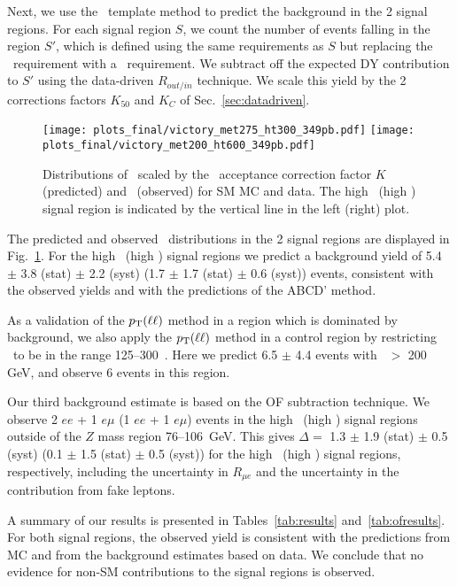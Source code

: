 Next, we use the \ptll\ template method to predict the background in the 2 signal regions.
For each signal region $S$, we count the number of events falling in the region $S'$, which is 
defined using the same requirements as $S$ but replacing the \MET\ requirement with a \ptll\
requirement. We subtract off the expected DY contribution to $S'$ using the data-driven $R_{out/in}$
technique. We scale this yield by the 2 corrections factors $K_{50}$ and $K_C$ of Sec.~\ref{sec:datadriven}.



\begin{figure}[hbt]
\begin{center}
\texttt{[image: plots\_final/victory\_met275\_ht300\_349pb.pdf]}
\texttt{[image: plots\_final/victory\_met200\_ht600\_349pb.pdf]}
\caption{\label{fig:victory}\protect 
Distributions of \ptll\ scaled by the \MET\ acceptance correction factor $K$ (predicted) 
and \met\ (observed) for SM MC and data. The high \MET\ (high \Ht) signal region
is indicated by the vertical line in the left (right) plot.
}
\end{center}
\end{figure}

The predicted and observed \MET\ distributions in the 2 signal regions are displayed
in Fig.~\ref{fig:victory}. For the high \MET\ (high \Ht) signal regions we predict
a background yield of 5.4 $\pm$ 3.8 (stat) $\pm$ 2.2 (syst) 
(1.7 $\pm$ 1.7 (stat) $\pm$ 0.6 (syst)) events, consistent with the observed yields
and with the predictions of the ABCD' method. 

As a validation of the $p_{\mathrm{T}}(\ell\ell)$ method in a region which is dominated by
background, we also apply the $p_{\mathrm{T}}(\ell\ell)$ method in a control region by restricting
\HT\ to be in the range 125--300~\GeV. Here we predict 6.5 $\pm$ 4.4 events with
\MET\ $>$ 200 GeV, and observe 6 events in this region.

Our third background estimate is based on the OF subtraction technique. We observe
2 $ee$ + 1 $e\mu$ (1 $ee$ + 1 $e\mu$) events in the high \MET\ (high \Ht) signal
regions outside of the $Z$ mass region 76--106~GeV. This gives 
$\Delta = $ 1.3 $\pm$ 1.9 (stat) $\pm$ 0.5 (syst) 
(0.1 $\pm$ 1.5 (stat) $\pm$ 0.5 (syst)) for the high \MET\ (high \Ht) signal regions,
respectively, including the uncertainty in $R_{\mu e}$ and the uncertainty in the
contribution from fake leptons.

A summary of our results is presented in Tables~\ref{tab:results} and~\ref{tab:ofresults}. For both signal regions,
the observed yield is consistent with the predictions from MC and from the background estimates
based on data. We conclude that no evidence for non-SM contributions to the signal regions
is observed.
